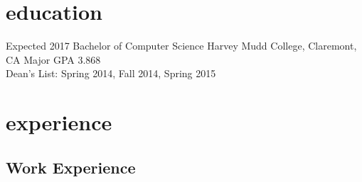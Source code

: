 \documentclass[print]{friggeri-cv} %
\begin{document}

\section{education}

\begin{entrylist}


\entry
{Expected 2017}
{Bachelor {\normalfont of Computer Science}}
{Harvey Mudd College, Claremont, CA}
{Major GPA 3.868 \\ Dean's List: Spring 2014, Fall 2014, Spring 2015}



\end{entrylist}


\section{experience}

\subsection{Work Experience}
\end{document}
